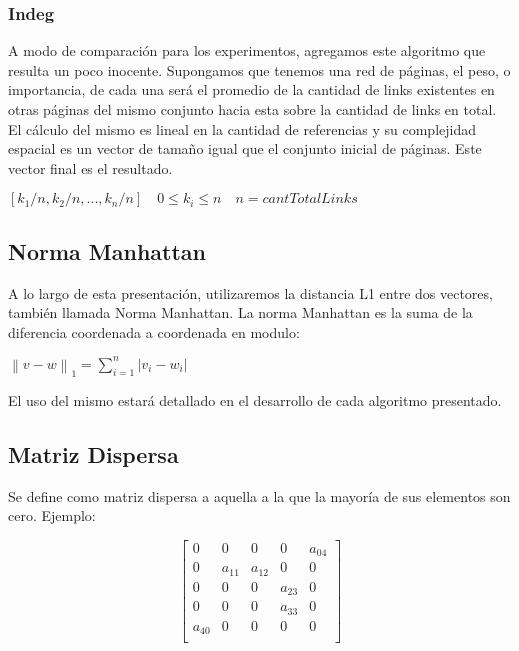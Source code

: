 \subsubsection{Indeg}
A modo de comparación para los experimentos, agregamos este algoritmo que resulta un poco inocente. Supongamos que tenemos una red de páginas, el peso, o importancia, de cada una será el promedio de la cantidad de links existentes en otras páginas del mismo conjunto hacia esta sobre la cantidad de links en total. El cálculo del mismo es lineal en la cantidad de referencias y su complejidad espacial es un vector de tamaño igual que el conjunto inicial de páginas. Este vector final es el resultado.

\begin{center}
$[k_1/n, k_2/n, ..., k_n/n]\quad 0 \leq k_i \leq n \quad n = cantTotalLinks$
\end{center}

\subsection{Norma Manhattan}

A lo largo de esta presentación, utilizaremos la distancia L1 entre dos vectores, también llamada Norma Manhattan.
La norma Manhattan es la suma de la diferencia coordenada a coordenada en modulo:

\begin{center}
$\left \| v - w \right \|_{1} = \sum_{i=1}^{n} \left | v_{i} - w_{i} \right |$
\end{center}

El uso del mismo estará detallado en el desarrollo de cada algoritmo presentado.


\subsection{Matriz Dispersa}
   Se define como matriz dispersa a aquella a la que la mayoría de sus elementos son cero.
   Ejemplo:

   $$ 
\begin{bmatrix}
       0    &      0    &   0       &   0           &   a_{04}    \\
       0    &   a_{11}  &   a_{12}  &   0           &   0    \\
       0    &      0    &   0       &   a_{23}      &   0    \\
       0    &      0    &   0       &   a_{33}      &   0    \\
  a_{40}    &      0    &   0       &   0           &   0    \\
\end{bmatrix} 
$$


